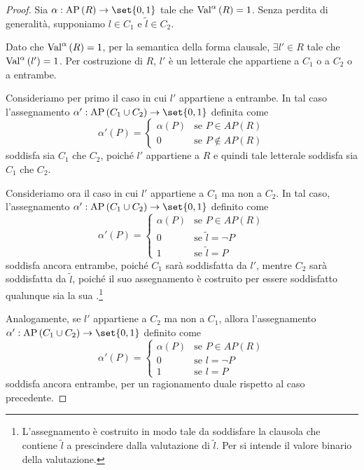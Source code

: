 \begin{proof}
  Sia \(\alpha: \AP[R] \to \set{0,1}\) tale che \(\Val{\alpha}[R] = 1\).
  Senza perdita di generalità, supponiamo \(l \in C_1\) e \(\tilde{l} \in C_2\).

  Dato che \(\Val{\alpha}[R] = 1\), per la semantica della forma clausale, \(\exists l' \in R\) tale che \(\Val{\alpha}[l'] = 1\).
  Per costruzione di \(R\), \(l'\) è un letterale che appartiene a \(C_1\) o a \(C_2\) o a entrambe.

  Consideriamo per primo il caso in cui \(l'\) appartiene a entrambe. In tal caso l'assegnamento \(\alpha': \AP[C_1\cup C_2]\to\set{0,1}\) definita come
  \[\alpha'(P) = \begin{cases}
                \alpha(P) & \text{se } P \in AP(R)\\
                0 & \text{se } P \not\in AP(R) 
              \end{cases}\]
              soddisfa sia \(C_1\) che \(C_2\), poiché \(l'\) appartiene a \(R\) e quindi tale letterale soddisfa sia \(C_1\) che \(C_2\).

  Consideriamo ora il caso in cui \(l'\) appartiene a \(C_1\) ma non a \(C_2\). In tal caso, l'assegnamento \(\alpha': \AP[C_1\cup C_2]\to\set{0,1}\) definito come
  \[\alpha'(P) = \begin{cases}
                \alpha(P) & \text{se } P \in AP(R)\\
                0 & \text{se } \tilde{l} = \neg P\\
                1 & \text{se } \tilde{l} = P
              \end{cases}
  \]
  soddisfa ancora entrambe, poiché \(C_1\) sarà soddisfatta da \(l'\), mentre \(C_2\) sarà soddisfatta da \(\tilde{l}\), poiché il suo assegnamento è costruito per essere soddisfatto qualunque sia la sua .\footnote{L'assegnamento è costruito in modo tale da soddisfare la clausola che contiene \(\tilde{l}\) a prescindere dalla valutazione di \(\tilde{l}\). Per  si intende il valore binario della valutazione.}

  Analogamente, se \(l'\) appartiene a \(C_2\) ma non a \(C_1\), allora l'assegnamento \(\alpha': \AP[C_1\cup C_2]\to\set{0,1}\) definito come
  \[\alpha'(P) = \begin{cases}
                \alpha(P) & \text{se } P \in AP(R)\\
                0 & \text{se } l = \neg P\\
                1 & \text{se } l = P
              \end{cases}
  \]
  soddisfa ancora entrambe, per un ragionamento duale rispetto al caso precedente.
\end{proof}

